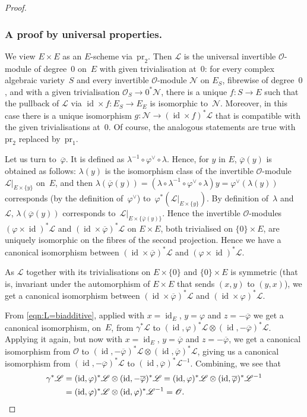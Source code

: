 \documentclass[11pt]{article}
\let\mathcal\mathscr
\let\oldvee\vee
\renewcommand{\vee}{{\scriptscriptstyle\oldvee}}
\theoremstyle{plain}
\theoremstyle{definition}
\numberwithin{equation}{subsection}
\let\ol\overline
\let\phi\varphi
\newcommand{\calL}{\mathcal{L}}
\newcommand{\calN}{\mathcal{N}}
\newcommand{\calO}{\mathcal{O}}
\newcommand{\pr}{\mathrm{pr}}
\DeclareMathOperator{\id}{id}
\begin{document}
\begin{proof}
\subsubsection*{A proof by universal properties.} We view
$E\times E$ as an $E$-scheme via~$\pr_2$. Then $\calL$ is the
universal invertible $\calO$-module of degree~$0$ on~$E$ with given
trivialisation at~$0$: for every complex algebraic variety~$S$ and
every invertible $\calO$-module $\calN$ on $E_S$, fibrewise of
degree~$0$, and with a given trivialisation $\calO_S\to 0^*\calN$,
there is a unique $f\colon S\to E$ such that the pullback of $\calL$
via $\id\times f\colon E_S\to E_E$ is isomorphic to~$\calN$. Moreover,
in this case there is a unique isomorphism $g\colon \calN\to
(\id\times f)^*\calL$ that is compatible with the given
trivialisations at~$0$. Of course, the analogous statements are true
with $\pr_2$ replaced by~$\pr_1$.

Let us turn to~$\ol{\phi}$. It is defined as
$\lambda^{-1}\circ\phi^\vee\circ\lambda$. Hence, for $y$ in $E$,
$\ol{\phi}(y)$ is obtained as follows: $\lambda(y)$ is the isomorphism
class of the invertible $\calO$-module $\calL|_{E\times\{y\}}$ on~$E$,
and then
$\lambda(\ol{\phi}(y))=
(\lambda\circ\lambda^{-1}\circ\phi^\vee\circ\lambda)y
=\phi^\vee(\lambda(y))$ corresponds (by the definition of~$\phi^\vee$)
to~$\phi^*(\calL|_{E\times\{y\}})$. By definition of~$\lambda$
and~$\calL$, $\lambda(\ol{\phi}(y))$ corresponds
to~$\calL|_{E\times\{\ol{\phi}(y)\}}$. Hence the invertible
$\calO$-modules $(\phi\times\id)^*\calL$ and
$(\id\times\ol{\phi})^*\calL$ on $E\times E$, both trivialised on
$\{0\}\times E$, are uniquely isomorphic on the fibres of the
second projection. Hence we have a canonical isomorphism
between $(\id\times\ol{\phi})^*\calL$ and $(\phi\times\id)^*\calL$.

As $\calL$ together with its trivialisations on $E\times\{0\}$ and
$\{0\}\times E$ is symmetric (that is, invariant under the
automorphism of $E\times E$ that sends $(x,y)$ to $(y,x)$), we get a
canonical isomorphism between $(\id\times\ol{\phi})^*\calL$ and
$(\id\times \phi)^*\calL$.

From \eqref{eqn:L=biadditive}, applied with $x=\id_E$, $y=\phi$ and
$z=-\ol{\phi}$ we get a canonical isomorphism, on~$E$, from
$\gamma^*\calL$ to
$(\id,\phi)^*\calL\otimes(\id,-\ol{\phi})^*\calL$. Applying it again,
but now with $x=\id_E$, $y=\ol{\phi}$ and $z=-\ol{\phi}$, we get a
canonical isomorphism from $\calO$ to
$(\id,-\ol{\phi})^*\calL\otimes(\id,\ol{\phi})^*\calL$, giving us a
canonical isomorphism from $(\id,-\ol{\phi})^*\calL$ to
$(\id,\ol{\phi})^*\calL^{-1}$. Combining, we see that
\begin{align*}
\gamma^*\calL & = (\id,\phi)^*\calL\otimes(\id,-\ol{\phi})^*\calL
= (\id,\phi)^*\calL\otimes(\id,\ol{\phi})^*\calL^{-1} \\
& = (\id,\phi)^*\calL\otimes(\id,\phi)^*\calL^{-1} = \calO.\qedhere
\end{align*}
\end{proof}
\end{document}

